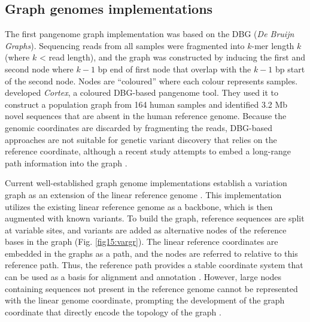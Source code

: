 \documentclass[../main.tex]{subfiles}
\begin{document}
\subsection*{Graph genomes implementations}

The first pangenome graph implementation was based on the DBG (\emph{De Bruijn Graphs}). Sequencing reads from all samples were fragmented into $k$-mer length $k$ (where $k$ < read length), and the graph was constructed by inducing the first and second node where $k-1$ bp end of first node that overlap with the $k-1$ bp start of the second node. Nodes are “coloured” where each colour represents samples. \citet{iqbal2012novo} developed \emph{Cortex}, a coloured DBG-based pangenome tool. They used it to construct a population graph from 164 human samples and identified 3.2 Mb novel sequences that are absent in the human reference genome. Because the genomic coordinates are discarded by fragmenting the reads, DBG-based approaches are not suitable for genetic variant discovery that relies on the reference coordinate, although a recent study attempts to embed a long-range path information into the graph \citep{turner2018integrating}. 

Current well-established graph genome implementations establish a variation graph as an extension of the linear reference genome \citep{eggertsson2017graphtyper,garrison2018variation,sibbesen2018accurate,rakocevic2019fast,kim2019graph}. This implementation utilizes the existing linear reference genome as a backbone, which is then augmented with known variants. To build the graph, reference sequences are split at variable sites, and variants are added as alternative nodes of the reference bases in the graph (Fig. \ref{fig15:vargr}). The linear reference coordinates are embedded in the graphs as a path, and the nodes are referred to relative to this reference path. Thus, the reference path provides a stable coordinate system that can be used as a basis for alignment and annotation \citep{garrison2018variation}. However, large nodes containing sequences not present in the reference genome cannot be represented with the linear genome coordinate, prompting the development of the graph coordinate that directly encode the topology of the graph \citep{paten2017genome,eizenga2020pangenome}. \\
\end{document}
